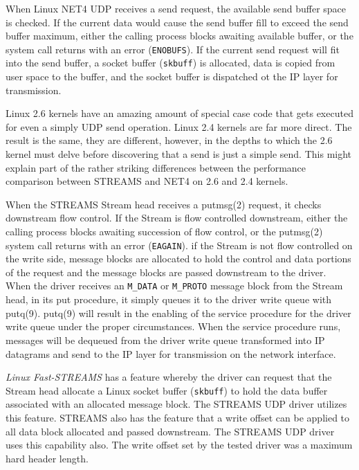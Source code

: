 \documentclass[letterpaper,final,notitlepage,twocolumn,10pt,twoside]{article}
\begin{document}
When Linux NET4 UDP receives a send request, the available send buffer space
is checked.  If the current data would cause the send buffer fill to exceed
the send buffer maximum, either the calling process blocks awaiting available
buffer, or the system call returns with an error (\texttt{ENOBUFS}).  If the
current send request will fit into the send buffer, a socket buffer
(\texttt{skbuff}) is allocated, data is copied from user space to the buffer,
and the socket buffer is dispatched ot the IP layer for transmission.

Linux 2.6 kernels have an amazing amount of special case code that gets
executed for even a simply UDP send operation.  Linux 2.4 kernels are far more
direct.  The result is the same, they are different, however, in the depths to
which the 2.6 kernel must delve before discovering that a send is just a
simple send.  This might explain part of the rather striking differences
between the performance comparison between STREAMS and NET4 on 2.6 and 2.4
kernels.

When the STREAMS Stream head receives a putmsg(2) request, it checks
downstream flow control.  If the Stream is flow controlled downstream, either
the calling process blocks awaiting succession of flow control, or the
putmsg(2) system call returns with an error (\texttt{EAGAIN}).  if the Stream
is not flow controlled on the write side, message blocks are allocated to hold
the control and data portions of the request and the message blocks are passed
downstream to the driver.  When the driver receives an \texttt{M\_DATA} or
\texttt{M\_PROTO} message block from the Stream head, in its put procedure, it
simply queues it to the driver write queue with putq(9).  putq(9) will result
in the enabling of the service procedure for the driver write queue under the
proper circumstances.  When the service procedure runs, messages will be
dequeued from the driver write queue transformed into IP datagrams and send to
the IP layer for transmission on the network interface.

\textsl{Linux Fast-STREAMS} has a feature whereby the driver can request that
the Stream head allocate a Linux socket buffer (\texttt{skbuff}) to hold the
data buffer associated with an allocated message block.  The STREAMS UDP
driver utilizes this feature.  STREAMS also has the feature that a write
offset can be applied to all data block allocated and passed downstream.  The
STREAMS UDP driver uses this capability also.  The write offset set by the
tested driver was a maximum hard header length.
\end{document}
